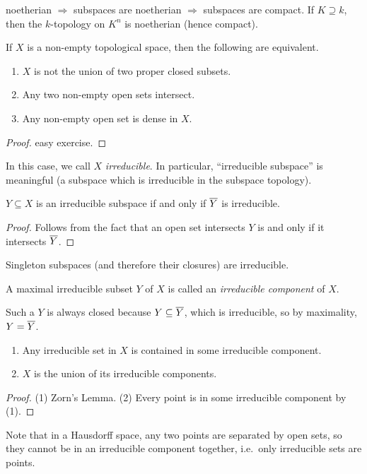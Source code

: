  \setcounter{lecture}{18}

 noetherian $\Rightarrow$ subspaces are noetherian $\Rightarrow$ subspaces are compact.
 If $K\supseteq k$, then the $k$-topology on $K^n$ is noetherian (hence compact).

 \begin{proposition}
   If $X$ is a non-empty topological space, then the following are equivalent.
   \begin{enumerate}
     \item $X$ is not the union of two proper closed subsets.
     \item Any two non-empty open sets intersect.
     \item Any non-empty open set is dense in $X$.
   \end{enumerate}
 \end{proposition}
 \begin{proof}
   easy exercise.
 \end{proof}
 In this case, we call $X$ \emph{irreducible}. In particular, ``irreducible subspace'' is
 meaningful (a subspace which is irreducible in the subspace topology).
 \begin{corollary}
   $Y\subseteq X$ is an irreducible subspace if and only if $\overline{Y}$ is irreducible.
 \end{corollary}
 \begin{proof}
   Follows from the fact that an open set intersects $Y$ is and only if it intersects
   $\overline{Y}$.
 \end{proof}
 \begin{example}
   Singleton subspaces (and therefore their closures) are irreducible.
 \end{example}
 \begin{definition}
   A maximal irreducible subset $Y$ of $X$ is called an \emph{irreducible component} of $X$.
 \end{definition}
 Such a $Y$ is always closed because $Y\subseteq \overline{Y}$, which is irreducible, so by
 maximality, $Y=\overline{Y}$.
 \begin{proposition}
   \begin{enumerate}
     \item Any irreducible set in $X$ is contained in some irreducible component.
     \item $X$ is the union of its irreducible components.
   \end{enumerate}
 \end{proposition}
 \begin{proof}
   (1) Zorn's Lemma.
   (2) Every point is in some irreducible component by (1).
 \end{proof}
 Note that in a Hausdorff space, any two points are separated by open sets, so they
 cannot be in an irreducible component together, i.e.\ only irreducible sets are points.

